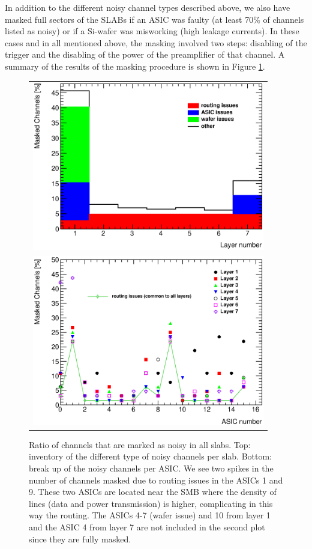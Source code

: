 \documentclass[a4paper,11pt]{article}
\begin{document}
In addition to the different noisy channel types described above, we also have
masked full sectors of the SLABs if an ASIC was faulty (at least 70\% of channels 
listed as noisy) or if a Si-wafer was misworking (high leakage currents). In these cases 
and in all mentioned above, the masking involved two steps: disabling of the trigger and 
the disabling of the power of the preamplifier of that channel. A summary of the results of the masking procedure is shown in Figure \ref{noisycells}.

\begin{figure}[!t]
  \centering
  \begin{tabular}{l}
  \includegraphics[width=4in]{figs/commissioning/masked_layer.eps} \\
  \includegraphics[width=4in]{figs/commissioning/masked_chip.eps}
  \end{tabular}
\caption{Ratio of channels that are marked as noisy in all slabs. 
Top: inventory of the different type of noisy channels per slab. 
Bottom: break up of the noisy channels per ASIC. We see two spikes in the number of channels masked due to routing issues in the ASICs 1 and 9. 
These two ASICs are located near the SMB where the density of lines (data and power transmission) is higher, complicating in this way the
routing. The ASICs 4-7 (wafer issue) and 10 from layer 1 and the ASIC 4 from layer 7 are not included
in the second plot since they are fully masked.}
\label{noisycells}
\end{figure}
\end{document}
